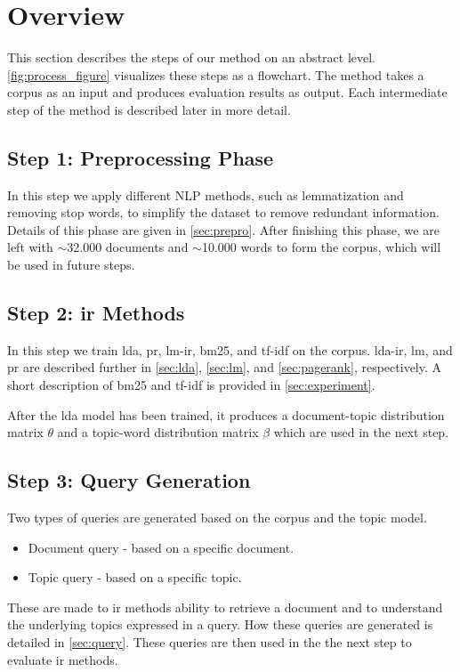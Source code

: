 \section{Overview}\label{sec:method}
This section describes the steps of our method on an abstract level.
\autoref{fig:process_figure} visualizes these steps as a flowchart.
The method takes a corpus as an input and produces evaluation results as output.
Each intermediate step of the method is described later in more detail.

\subsection*{Step 1: Preprocessing Phase}
In this step we apply different \gls{NLP} methods, such as lemmatization and removing stop words, to simplify the dataset to remove redundant information.
Details of this phase are given in \autoref{sec:prepro}.
After finishing this phase, we are left with $\sim$32.000 documents and $\sim$10.000 words to form the corpus, which will be used in future steps.

\subsection*{Step 2: \Gls{ir} Methods}
In this step we train \gls{lda}, \gls{pr}, \gls{lm}-\gls{ir}, \gls{bm25}, and \gls{tf-idf} on the corpus.
\gls{lda}-\gls{ir}, \gls{lm}, and \gls{pr} are described further in \autoref{sec:lda}, \autoref{sec:lm}, and \autoref{sec:pagerank}, respectively.
A short description of \gls{bm25} and \gls{tf-idf} is provided in \autoref{sec:experiment}.

After the \gls{lda} model has been trained, it produces a document-topic distribution matrix $\theta$ and a topic-word distribution matrix $\beta$ which are used in the next step.

\subsection*{Step 3: Query Generation}
Two types of queries are generated based on the corpus and the topic model.
\begin{itemize}
	\item Document query - based on a specific document.
	\item Topic query - based on a specific topic.
\end{itemize}
These are made to \gls{ir} methods ability to retrieve a document and to understand the underlying topics expressed in a query.
How these queries are generated is detailed in \autoref{sec:query}.
These queries are then used in the the next step to evaluate \gls{ir} methods.

